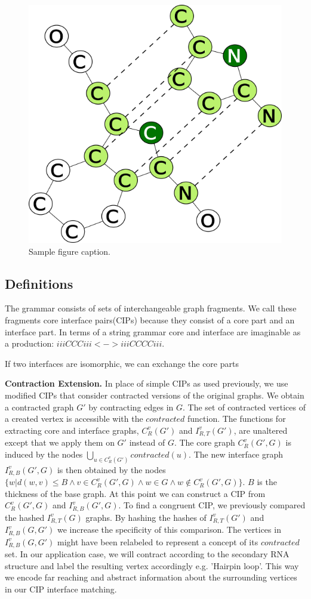 \documentclass{article}
\begin{document}
% 
\begin{figure}[ht]
      \centering
        \includegraphics[width=0.2\linewidth]{images/showcip.png}
      \caption{Sample figure caption.}
      \label{alabal}
\end{figure}

\subsection{Definitions}

The grammar consists of sets of interchangeable graph fragments.
We call these fragments core interface pairs(CIPs) because 
they consist of a core part and an interface part.
In terms of a string grammar core and interface are imaginable 
as a production: $iiiCCCiii <-> iiiCCCCiii$. 

If two interfaces are isomorphic, we can exchange the core parts


\textbf{Contraction Extension.}
In place of simple CIPs as used previously,
we use modified CIPs that consider contracted versions
of the original graphs. We obtain a contracted graph $G'$ by contracting edges
in $G$. The set of contracted vertices of a
created vertex is accessible with the $contracted$ function.
The functions for extracting core and interface graphs, 
$C_{R}^v(G')$ and $I_{R,T}^v(G')$, are unaltered except that we apply them
on $G'$ instead of $G$. 
The core graph $C_{R}^v(G',G)$ is induced by the nodes 
$\bigcup\limits_{u \in C_R^v(G')} contracted(u)$.
The new interface graph $I_{R,B}^v(G',G)$ is then obtained by the nodes 
$\{ w | d(w,v) \leq B \wedge v\in C_R^v(G',G) \wedge w \in G \wedge w 
\notin C_R^v(G',G) \}$.  $B$ is the thickness of the base graph. 
At this point we can construct a CIP from $C_R^v(G',G)$ and $I_{R,B}^v(G',G)$. 
To find a congruent CIP, we previously compared the hashed $I_{R,T}^v(G)$ 
graphs. By hashing the hashes of $I_{R,T}^v(G')$ and $I_{R,B}^v(G,G')$ we 
increase the specificity of this comparison. The vertices in $I_{R,B}^v(G,G')$ 
might have been relabeled to represent a concept of its $contracted$ set. In 
our application case, we will contract according to the 
secondary RNA structure and label the resulting vertex accordingly e.g.
'Hairpin loop'. This way we encode far reaching and abstract 
information about the surrounding vertices in our CIP interface matching.
\end{document}
